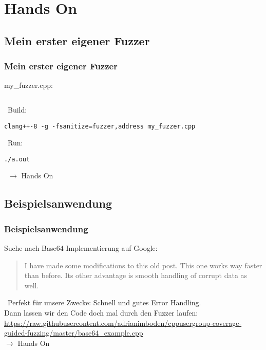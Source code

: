 \section{Hands On}
\subsection{Mein erster eigener Fuzzer}
\begin{frame}[fragile]
	\frametitle{Mein erster eigener Fuzzer}

	my\_fuzzer.cpp:
	\inputminted[fontsize=\scriptsize,linenos]{cpp}{snippets/first_fuzzer.cpp}
	\vspace{5mm}

	\pause\
	Build:
	\begin{verbatim}
clang++-8 -g -fsanitize=fuzzer,address my_fuzzer.cpp
  \end{verbatim}
	\vspace{5mm}

	\pause\
	Run:
	\begin{verbatim}
./a.out
  \end{verbatim}

	\pause\
	$\rightarrow$ Hands On
\end{frame}

\subsection{Beispielsanwendung}
\begin{frame}[fragile]
	\frametitle{Beispielsanwendung}

	Suche nach Base64 Implementierung auf Google:
	\pause\
	\begin{quote}
		I have made some modifications to this old post. This one works way faster than before. Its other advantage is smooth handling of corrupt data as well.
	\end{quote}
	\pause\
	Perfekt für unsere Zwecke: Schnell und gutes Error Handling.\\
	Dann lassen wir den Code doch mal durch den Fuzzer laufen:\\

	\url{https://raw.githubusercontent.com/adrianimboden/cppusergroup-coverage-guided-fuzzing/master/base64_example.cpp}
	\vspace{5mm}\\
	$\rightarrow$ Hands On

\end{frame}

